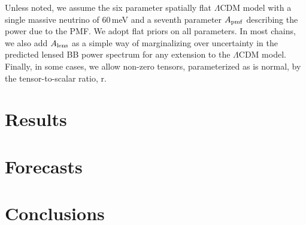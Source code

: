 \documentclass[preprint]{emulateapj}
\newcommand{\apmf}{\ensuremath{A_{\rm pmf}}}
\newcommand{\alens}{\ensuremath{A_{\rm lens}}}
\newcommand{\lcdm}{\ensuremath{\Lambda}CDM}
\begin{document}
Unless noted, we assume the six parameter spatially flat \lcdm{} model with a single massive neutrino of 60\,meV and a seventh parameter \apmf{} describing the power due to the PMF. 
We adopt flat priors on all parameters. 
In most chains, we also add \alens{} as a simple way of marginalizing over uncertainty in the predicted lensed BB power spectrum for any extension to the \lcdm{} model. 
Finally, in some cases, we allow non-zero tensors, parameterized as is normal, by the tensor-to-scalar ratio, r. 

 
\section{Results}
\label{sec:results}

\section{Forecasts}
\label{sec:forecasts}

\section{Conclusions}
\label{sec:conclusions}




\end{document}

